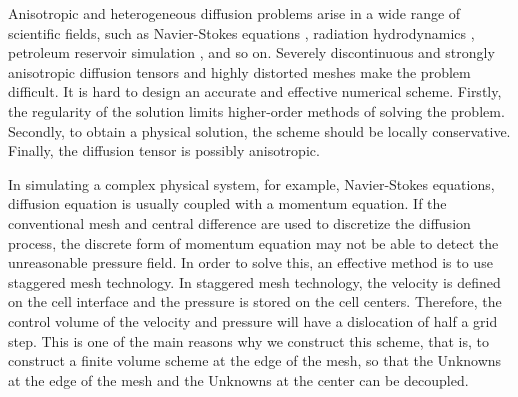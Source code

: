 \documentclass[times,review,preprint,authoryear]{elsarticle}
\begin{document}
Anisotropic and heterogeneous diffusion problems arise in a wide range of scientific fields, such as Navier-Stokes equations \cite{???}, radiation hydrodynamics \cite{???}, petroleum reservoir simulation \cite{???}, and so on.
Severely discontinuous and strongly anisotropic diffusion tensors and highly distorted meshes make the problem difficult. It is hard to design an accurate and effective numerical scheme.
Firstly, the regularity of the solution limits higher-order methods of solving the problem. Secondly, to obtain a physical solution, the scheme should be locally conservative. Finally, the diffusion tensor is possibly anisotropic.



In simulating a complex physical system, for example, Navier-Stokes equations, diffusion equation is usually coupled with a momentum equation. If the conventional mesh and central difference are used to discretize the diffusion process, the discrete form of momentum equation may not be able to detect the unreasonable pressure field. In order to solve this, an effective method is to use staggered mesh technology. In staggered mesh technology, the velocity is defined on the cell interface and the pressure is stored on the cell centers. Therefore, the control volume of the velocity and pressure will have a dislocation of half a grid step. This is one of the main reasons why we construct this scheme, that is, to construct a finite volume scheme at the edge of the mesh, so that the Unknowns at the edge of the mesh and the Unknowns at the center can be decoupled.
\end{document}
